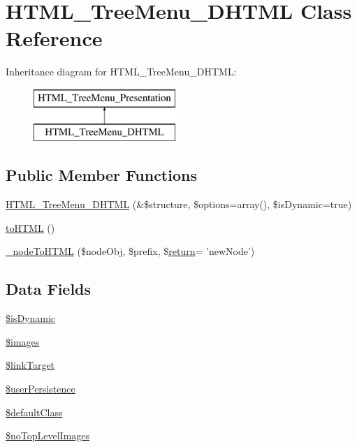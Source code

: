 \hypertarget{class_h_t_m_l___tree_menu___d_h_t_m_l}{\section{\-H\-T\-M\-L\-\_\-\-Tree\-Menu\-\_\-\-D\-H\-T\-M\-L \-Class \-Reference}
\label{class_h_t_m_l___tree_menu___d_h_t_m_l}
}
\-Inheritance diagram for \-H\-T\-M\-L\-\_\-\-Tree\-Menu\-\_\-\-D\-H\-T\-M\-L\-:\begin{figure}[H]
\begin{center}
\leavevmode
\includegraphics[height=2.000000cm]{class_h_t_m_l___tree_menu___d_h_t_m_l}
\end{center}
\end{figure}
\subsection*{\-Public \-Member \-Functions}
\begin{DoxyCompactItemize}
\item 
\hyperlink{class_h_t_m_l___tree_menu___d_h_t_m_l_a4f08871a82864aea9a889db895e988af}{\-H\-T\-M\-L\-\_\-\-Tree\-Menu\-\_\-\-D\-H\-T\-M\-L} (\&\$structure, \$options=array(), \$is\-Dynamic=true)
\item 
\hyperlink{class_h_t_m_l___tree_menu___d_h_t_m_l_abe9ad8cdef2c26dc57fe2b0cfaa8785b}{to\-H\-T\-M\-L} ()
\item 
\hyperlink{class_h_t_m_l___tree_menu___d_h_t_m_l_a6c8edca726c48b401e91ef6d450fdd98}{\-\_\-node\-To\-H\-T\-M\-L} (\$node\-Obj, \$prefix, \$\hyperlink{find__phpdoc_8php_a9717e7bbecb906637e86cef6da3d83c2}{return}= 'new\-Node')
\end{DoxyCompactItemize}
\subsection*{\-Data \-Fields}
\begin{DoxyCompactItemize}
\item 
\hyperlink{class_h_t_m_l___tree_menu___d_h_t_m_l_aa927a23cfdd5d6ac3df6fc7eedd64475}{\$is\-Dynamic}
\item 
\hyperlink{class_h_t_m_l___tree_menu___d_h_t_m_l_ab0c7013419fc5ee6238d17eff2554afe}{\$images}
\item 
\hyperlink{class_h_t_m_l___tree_menu___d_h_t_m_l_abc92a826d3c81eded7a4f7eac934f348}{\$link\-Target}
\item 
\hyperlink{class_h_t_m_l___tree_menu___d_h_t_m_l_a376d9d3d2e06444fc17f372b3d5395dd}{\$user\-Persistence}
\item 
\hyperlink{class_h_t_m_l___tree_menu___d_h_t_m_l_a0943707e40820b50d6f7f22a57cba351}{\$default\-Class}
\item 
\hyperlink{class_h_t_m_l___tree_menu___d_h_t_m_l_aecd84a357b47ff0561e12dc717702b5a}{\$no\-Top\-Level\-Images}
\end{DoxyCompactItemize}


